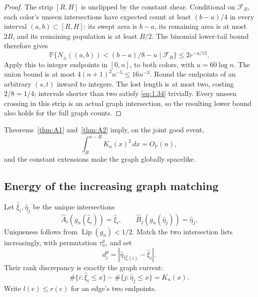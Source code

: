 \documentclass[11pt,reqno]{amsart}
\theoremstyle{definition}
\theoremstyle{remark}
\numberwithin{equation}{section}
\newcommand{\Pp}{\mathbb P}
\newcommand{\Lip}{\operatorname{Lip}}
\begin{document}
\begin{proof}
The strip \([R,H]\) is unclipped by the constant shear.  Conditional
on \(\mathcal F_R\), each color's unseen intersections have expected
count at least \((b-a)/4\) in every interval \((a,b)\subset[R,H]\):
its swept area is \(b-a\), its remaining area is at most \(2B\), and
its remaining population is at least \(B/2\).
The binomial lower-tail bound therefore gives
\begin{equation}
\Pp\{N_\pm((a,b))<(b-a)/8-u\mid\mathcal F_R\}
\le2e^{-u/12}.
\label{eq:1.35}
\end{equation}
Apply this to integer endpoints in \([0,n]\), to both colors, with
\(u=60\log n\).  The union bound is at most
\(4(n+1)^2n^{-5}\le16n^{-3}\).  Round the endpoints of an arbitrary
\((s,t)\) inward to integers.  The lost length is at most two, costing
\(2/8=1/4\); intervals shorter than two satisfy \eqref{eq:1.34} trivially.
Every unseen crossing in this strip is an actual graph intersection,
so the resulting lower bound also holds for the full graph counts.
\end{proof}

Theorems~\ref{thm:A1} and~\ref{thm:A2} imply, on the joint good event,
\begin{equation}
\int_B^{n-B}K_n(x)^2\,dx=O_{\Pp}(n),
\label{eq:1.36}
\end{equation}
and the constant extensions make the graph globally spacelike.

\subsection{Energy of the increasing graph matching}

Let \(\widehat\xi_i,\widehat\eta_j\) be the unique intersections
\begin{equation}
\widehat A_i(g_n(\widehat\xi_i))=\widehat\xi_i,\qquad
\widehat B_j(g_n(\widehat\eta_j))=\widehat\eta_j.
\label{eq:1.37}
\end{equation}
Uniqueness follows from \(\Lip(g_n)<1/2\).  Match the two intersection
lists increasingly, with permutation \(\tau_n^g\), and set
\begin{equation}
d_i^g=|\widehat\eta_{\tau_n^g(i)}-\widehat\xi_i|.
\label{eq:1.38}
\end{equation}
Their rank discrepancy is exactly the graph current:
\begin{equation}
\#\{i:\widehat\xi_i\le x\}-\#\{j:\widehat\eta_j\le x\}=K_n(x).
\label{eq:1.39}
\end{equation}
Write \(l(e)\le r(e)\) for an edge's two endpoints.
\end{document}

